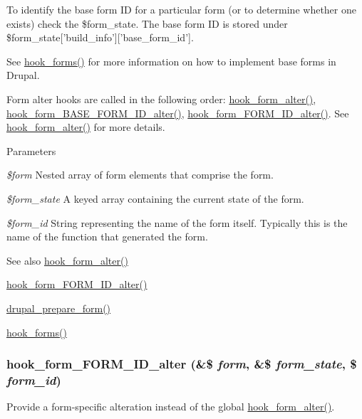 To identify the base form ID for a particular form (or to determine whether one exists) check the \$form\_\-state. The base form ID is stored under \$form\_\-state\mbox{[}'build\_\-info'\mbox{]}\mbox{[}'base\_\-form\_\-id'\mbox{]}.

See \hyperlink{group__hooks_gaa764fee74b85797f75c0c923cad628d5}{hook\_\-forms()} for more information on how to implement base forms in Drupal.

Form alter hooks are called in the following order: \hyperlink{group__hooks_ga6df3cea27ae1407aeef4eae5444cb213}{hook\_\-form\_\-alter()}, \hyperlink{group__hooks_gaf0cfc224a88c8823da68856c30a4841a}{hook\_\-form\_\-BASE\_\-FORM\_\-ID\_\-alter()}, \hyperlink{group__hooks_ga8d4a4089551493d55911bd5c4f218264}{hook\_\-form\_\-FORM\_\-ID\_\-alter()}. See \hyperlink{group__hooks_ga6df3cea27ae1407aeef4eae5444cb213}{hook\_\-form\_\-alter()} for more details.


\begin{DoxyParams}{Parameters}
\item[{\em \$form}]Nested array of form elements that comprise the form. \item[{\em \$form\_\-state}]A keyed array containing the current state of the form. \item[{\em \$form\_\-id}]String representing the name of the form itself. Typically this is the name of the function that generated the form.\end{DoxyParams}
\begin{DoxySeeAlso}{See also}
\hyperlink{group__hooks_ga6df3cea27ae1407aeef4eae5444cb213}{hook\_\-form\_\-alter()} 

\hyperlink{group__hooks_ga8d4a4089551493d55911bd5c4f218264}{hook\_\-form\_\-FORM\_\-ID\_\-alter()} 

\hyperlink{group__form__api_ga79309515217249c16c7e4a7117141120}{drupal\_\-prepare\_\-form()} 

\hyperlink{group__hooks_gaa764fee74b85797f75c0c923cad628d5}{hook\_\-forms()} 
\end{DoxySeeAlso}
\hypertarget{group__hooks_ga8d4a4089551493d55911bd5c4f218264}{
\subsubsection[{hook\_\-form\_\-FORM\_\-ID\_\-alter}]{\setlength{\rightskip}{0pt plus 5cm}hook\_\-form\_\-FORM\_\-ID\_\-alter (\&\$ {\em form}, \/  \&\$ {\em form\_\-state}, \/  \$ {\em form\_\-id})}}
\label{group__hooks_ga8d4a4089551493d55911bd5c4f218264}
Provide a form-\/specific alteration instead of the global \hyperlink{group__hooks_ga6df3cea27ae1407aeef4eae5444cb213}{hook\_\-form\_\-alter()}.

